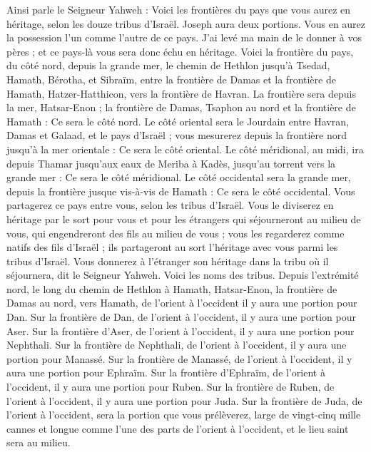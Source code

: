 \begin{multicols}{2}
Ainsi parle le Seigneur Yahweh : Voici les frontières du pays que vous aurez en héritage, selon les douze tribus d'Israël. Joseph aura deux portions.
Vous en aurez la possession l'un comme l'autre de ce pays. J'ai levé ma main de le donner à vos pères ; et ce pays-là vous sera donc échu en héritage.
Voici la frontière du pays, du côté nord, depuis la grande mer, le chemin de Hethlon jusqu’à Tsedad,
Hamath, Bérotha, et Sibraïm, entre la frontière de Damas et la frontière de Hamath, Hatzer-Hatthicon, vers la frontière de Havran.
La frontière sera depuis la mer, Hatsar-Enon ; la frontière de Damas, Tsaphon au nord et la frontière de Hamath : Ce sera le côté nord.
Le côté oriental sera le Jourdain entre Havran, Damas et Galaad, et le pays d'Israël ; vous mesurerez depuis la frontière nord jusqu’à la mer orientale : Ce sera le côté oriental.
Le côté méridional, au midi, ira depuis Thamar jusqu’aux eaux de Meriba à Kadès, jusqu’au torrent vers la grande mer : Ce sera le côté méridional.
Le côté occidental sera la grande mer, depuis la frontière jusque vis-à-vis de Hamath : Ce sera le côté occidental.
Vous partagerez ce pays entre vous, selon les tribus d'Israël.
Vous le diviserez en héritage par le sort pour vous et pour les étrangers qui séjourneront au milieu de vous, qui engendreront des fils au milieu de vous ; vous les regarderez comme natifs des fils d’Israël ; ils partageront au sort l’héritage avec vous parmi les tribus d’Israël.
Vous donnerez à l'étranger son héritage dans la tribu où il séjournera, dit le Seigneur Yahweh.
\VerseOne{}Voici les noms des tribus. Depuis l’extrémité nord, le long du chemin de Hethlon à Hamath, Hatsar-Enon, la frontière de Damas au nord, vers Hamath, de l'orient à l'occident il y aura une portion pour Dan.
Sur la frontière de Dan, de l’orient à l’occident, il y aura une portion pour Aser.
Sur la frontière d'Aser, de l’orient à l’occident, il y aura une portion pour Nephthali.
Sur la frontière de Nephthali, de l’orient à l’occident, il y aura une portion pour Manassé.
Sur la frontière de Manassé, de l’orient à l’occident, il y aura une portion pour Ephraïm.
Sur la frontière d'Ephraïm, de l’orient à l’occident, il y aura une portion pour Ruben.
Sur la frontière de Ruben, de l’orient à l'occident, il y aura une portion pour Juda.
Sur la frontière de Juda, de l’orient à l’occident, sera la portion que vous prélèverez, large de vingt-cinq mille cannes et longue comme l’une des parts de l’orient à l’occident, et le lieu saint sera au milieu.

\end{multicols}
